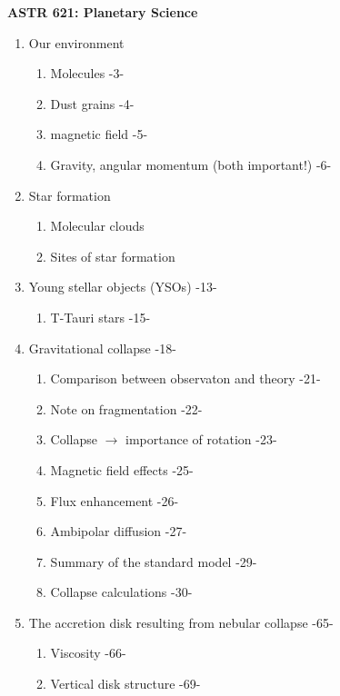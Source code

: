 \documentclass[12pt]{article}
\begin{document}
\textbf{ASTR 621: Planetary Science}

\begin{enumerate}[label=\Roman*.]
    \item Our environment
        \begin{enumerate}[label=\arabic*.]
            \item Molecules -3-
            \item Dust grains -4-
            \item magnetic field -5-
            \item Gravity, angular momentum (both important!) -6-
        \end{enumerate}
    \item Star formation
        \begin{enumerate}[label=\arabic*.]
            \item Molecular clouds
            \item Sites of star formation
        \end{enumerate}
    \item Young stellar objects (YSOs) -13-
        \begin{enumerate}[label=\arabic*.]
            \item T-Tauri stars -15-
        \end{enumerate}
    \item Gravitational collapse -18-
        \begin{enumerate}[label=\arabic*.]
            \item Comparison between observaton and theory -21-
            \item Note on fragmentation -22-
            \item Collapse $\rightarrow$ importance of rotation -23-
            \item Magnetic field effects -25-
            \item Flux enhancement -26-
            \item Ambipolar diffusion -27-
            \item Summary of the standard model -29-
            \item Collapse calculations -30-
        \end{enumerate}
    \item The accretion disk resulting from nebular collapse -65-
        \begin{enumerate}[label=\arabic*.]
            \item Viscosity -66-
            \item Vertical disk structure -69-

\end{enumerate}
\end{enumerate}
\end{document}
